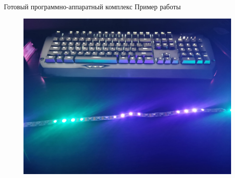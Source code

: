 \begin{frame}{Готовый программно-аппаратный комплекс}
  Пример работы

  \begin{figure}[H]
    \centering
    \includegraphics[height=0.75\textheight]{assets/images/ws2812__in_work.jpg}
  \end{figure}
\end{frame}
